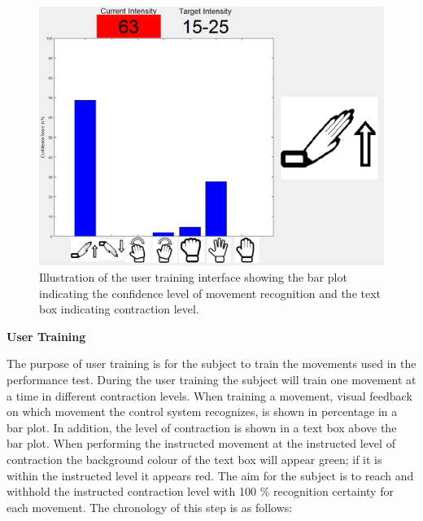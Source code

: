 \begin{figure}[H]                 
	\includegraphics[width=.6\textwidth]{figures/xBackground/usertraintestGUI}  
	\caption{Illustration of the user training interface showing the bar plot indicating the confidence level of movement recognition and the text box indicating contraction level.}
	\label{fig:usertraintestGUI} 
\end{figure}

\textbf{User Training} %

The purpose of user training is for the subject to train the movements used in the performance test. During the user training the subject will train one movement at a time in different contraction levels. When training a movement, visual feedback on which movement the control system recognizes, is shown in percentage in a bar plot. In addition, the level of contraction is shown in a text box above the bar plot. When performing the instructed movement at the instructed level of contraction the background colour of the text box will appear green; if it is within the instructed level it appears red. The aim for the subject is to reach and withhold the instructed contraction level with 100 \% recognition certainty for each movement. The chronology of this step is as follows:

